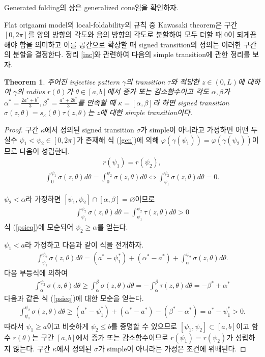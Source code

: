 \documentclass{amsart}
\theoremstyle{plain}
\newtheorem{theorem}{Theorem}[section]
\theoremstyle{definition}
\theoremstyle{remark}
\begin{document}
Generated folding의 상은 generalized cone임을 확인하자.

Flat origaami model의 local-foldability의 규칙 중 Kawasaki theorem은 구간 $[0,2\pi]$를 양의 방향의 각도와 음의 방향의 각도로 분할하여 모두 더할 때 $0$이 되게끔 해야 함을 의미하고 이를 공간으로 확장할 때 signed transition의 정의는 이러한 구간의 분할을 결정한다.
정리 \ref{inc}와 관련하여 다음의 simple transition에 관한 정리를 보자.

\begin{theorem}%
주어진 injective pattern $\gamma$의 transition $\tau$와 적당한 $z\in(0,L)$에 대하여 $\gamma$의 radius $r(\theta)$가 $\theta\in[a,b]$에서 증가 또는 감소함수이고 각도 $\alpha, \beta$가 $\alpha^*=\frac{2a^*+b^*}3, \beta^*=\frac{a^*+2b^*}3$를 만족할 때 $\kappa=[\alpha,\beta]$라 하면 signed transition $\sigma(z,\theta)=s_{\kappa}(\theta)\tau(z,\theta)$는 $z$에 대한 simple transition이다.
\end{theorem}

\begin{proof}
구간 $\kappa$에서 정의된 signed transition $\sigma$가 simple이 아니라고 가정하면 어떤 두 실수 $\psi_1<\psi_2\in[0,2\pi]$가 존재해 식 (\ref{gen})에 의해 $\varphi(\gamma(\psi_1))=\varphi(\gamma(\psi_2))$이므로 다음이 성립한다.
\begin{align*}
r(\psi_1)=r(\psi_2),
\end{align*}
\begin{align}\label{psieq}
\int_0^{\psi_1} \sigma(z,\theta)d\theta=\int_0^{\psi_2} \sigma(z,\theta)d\theta
\iff \int_{\psi_1}^{\psi_2} \sigma(z,\theta)d\theta=0.
\end{align}

$\psi_2<\alpha$라 가정하면 $[\psi_1,\psi_2]\cap[\alpha,\beta]=\varnothing$이므로
\begin{align*}
\int_{\psi_1}^{\psi_2} \sigma(z,\theta)d\theta=\int_{\psi_1}^{\psi_2} \tau(z,\theta)d\theta>0
\end{align*}
식 (\ref{psieq})에 모순되어 $\psi_2\ge\alpha$를 얻는다.

$\psi_1<a$라 가정하고 다음과 같이 식을 전개하자.
\begin{align*}
\int_{\psi_1}^{\psi_2} \sigma(z,\theta)d\theta=\left(a^*-\psi_1^*\right)+\left(\alpha^*-a^*\right)+\int_{\alpha}^{\psi_2} \sigma(z,\theta)d\theta.
\end{align*}
다음 부등식에 의하여
\begin{align*}
\int_{\alpha}^{\psi_2} \sigma(z,\theta)d\theta
\ge\int_{\alpha}^{\beta} \sigma(z,\theta)d\theta
=-\int_{\alpha}^{\beta} \tau(z,\theta)d\theta=-\beta^*+\alpha^*
\end{align*}
다음과 같은 식 (\ref{psieq})에 대한 모순을 얻는다.
\begin{align*}
\int_{\psi_1}^{\psi_2} \sigma(z,\theta)d\theta\ge\left(a^*-\psi_1^*\right)+\left(\alpha^*-a^*\right)-\left(\beta^*-\alpha^*\right)=a^*-\psi_1^*>0.
\end{align*}
따라서 $\psi_1\ge a$이고 비슷하게 $\psi_2\le b$를 증명할 수 있으므로 $[\psi_1,\psi_2]\subset[a,b]$이고 함수 $r(\theta)$는 구간 $[a,b]$에서 증가 또는 감소함수이므로 $r(\psi_1)=r(\psi_2)$가 성립하지 않는다.
구간 $\kappa$에서 정의된 $\sigma$가 simple이 아니라는 가정은 조건에 위배된다.
\end{proof}
\end{document}
